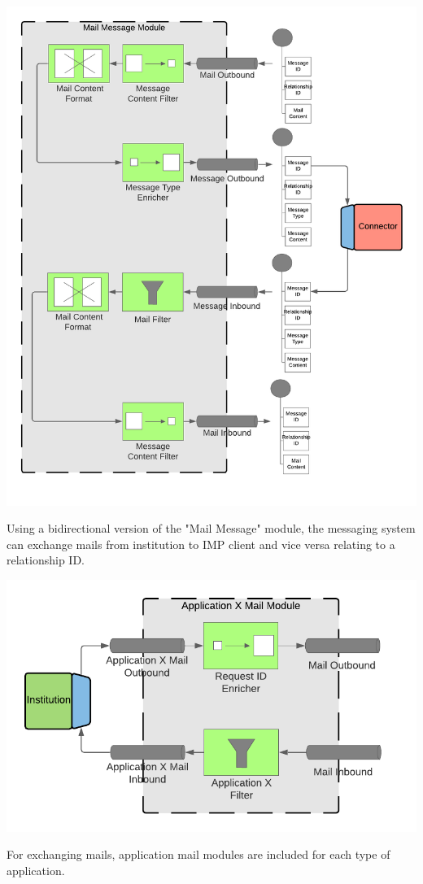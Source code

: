 \begin{center}
    \includegraphics[scale=0.6]{Diagrams/Integration Architecture 2/Mail Message Module.pdf}
\end{center}

Using a bidirectional version of the "Mail Message" module, the messaging system can exchange mails from institution to IMP client and vice versa relating to a relationship ID.

\begin{center}
    \includegraphics[scale=0.6]{Diagrams/Integration Architecture 2/Application Mail Module.pdf}
\end{center}

For exchanging mails, application mail modules are included for each type of application.